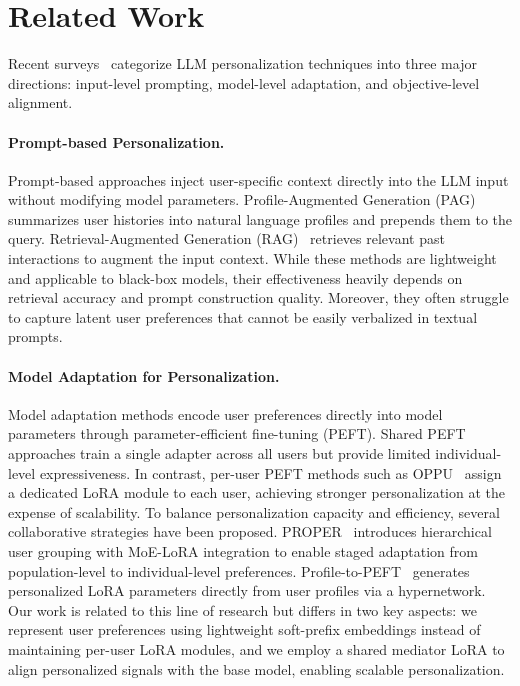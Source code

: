 \documentclass[11pt]{article}
\begin{document}
\section{Related Work}

Recent surveys~\cite{liu2025survey} categorize LLM personalization techniques into three major directions: input-level prompting, model-level adaptation, and objective-level alignment.

\paragraph{Prompt-based Personalization.}
Prompt-based approaches inject user-specific context directly into the LLM input without modifying model parameters. Profile-Augmented Generation (PAG)~\cite{richardson2023integrating} summarizes user histories into natural language profiles and prepends them to the query. Retrieval-Augmented Generation (RAG)~\cite{salemi2024lamp,mysore-etal-2024-pearl} retrieves relevant past interactions to augment the input context. While these methods are lightweight and applicable to black-box models, their effectiveness heavily depends on retrieval accuracy and prompt construction quality. Moreover, they often struggle to capture latent user preferences that cannot be easily verbalized in textual prompts.

\paragraph{Model Adaptation for Personalization.}
Model adaptation methods encode user preferences directly into model parameters through parameter-efficient fine-tuning (PEFT). Shared PEFT approaches train a single adapter across all users but provide limited individual-level expressiveness. In contrast, per-user PEFT methods such as OPPU~\cite{tan2024democratizing} assign a dedicated LoRA module to each user, achieving stronger personalization at the expense of scalability. To balance personalization capacity and efficiency, several collaborative strategies have been proposed. PROPER~\cite{zhang2025proper} introduces hierarchical user grouping with MoE-LoRA integration to enable staged adaptation from population-level to individual-level preferences. Profile-to-PEFT~\cite{tan2025instant} generates personalized LoRA parameters directly from user profiles via a hypernetwork. Our work is related to this line of research but differs in two key aspects: we represent user preferences using lightweight soft-prefix embeddings instead of maintaining per-user LoRA modules, and we employ a shared mediator LoRA to align personalized signals with the base model, enabling scalable personalization.
\end{document}
